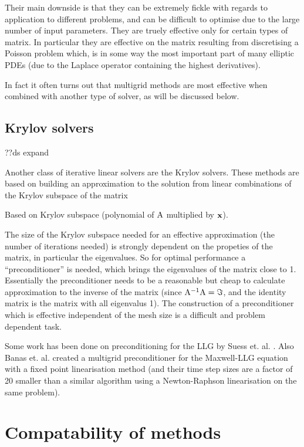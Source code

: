 Their main downside is that they can be extremely fickle with regards to application to different problems, and can be difficult to optimise due to the large number of input parameters.
They are truely effective only for certain types of matrix.
In particular they are effective on the matrix resulting from discretising a Poisson problem which, is in some way the most important part of many elliptic PDEs (due to the Laplace operator containing the highest derivatives).

In fact it often turns out that multigrid methods are most effective when combined with another type of solver, as will be discussed below.


\subsection{Krylov solvers}
\label{sec:krylov-solvers}

??ds expand

Another class of iterative linear solvers are the Krylov solvers.
These methods are based on building an approximation to the solution from linear combinations of the Krylov subspace of the matrix

Based on Krylov subspace (polynomial of $\mathrm{A}$ multiplied by $\mathbf{x}$).

The size of the Krylov subspace needed for an effective approximation (\ie the number of iterations needed) is strongly dependent on the propeties of the matrix, in particular the eigenvalues.
So for optimal performance a ``preconditioner'' is needed, which brings the eigenvalues of the matrix close to 1.
Essentially the preconditioner needs to be a reasonable but cheap to calculate approximation to the inverse of the matrix (since $\mathrm{A}^{-1}\mathrm{A} = \Im$, and the identity matrix is the matrix with all eigenvalus 1).
The construction of a preconditioner which is effective independent of the mesh size is a difficult and problem dependent task. 

Some work has been done on preconditioning for the LLG by Suess et. al. \cite{Suess2002}.
Also Banas et. al.\cite{Banas2008} \cite{Banas2010} created a multigrid preconditioner for the Maxwell-LLG equation with a fixed point linearisation method (and their time step sizes are a factor of 20 smaller than a similar algorithm using a Newton-Raphson linearisation on the same problem).



\section{Compatability of methods}
\label{sec:comp-meth}


